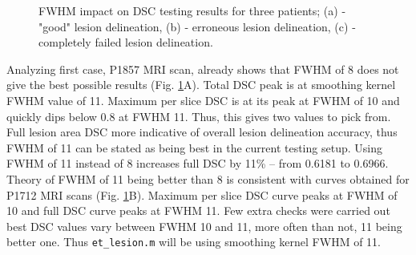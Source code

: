 \documentclass[12pt]{article}
\begin{document}
\begin{figure}[!htb]
\centering
{}


\caption{FWHM impact on DSC testing results for three patients; (a) - "good" lesion delineation, (b) - erroneous lesion delineation, (c) - completely failed lesion delineation.}
\label{fig:fwhms}
\end{figure}

Analyzing first case, P1857 MRI scan, already shows that FWHM of 8 does not give the best possible results (Fig. \ref{fig:fwhms}A). Total DSC peak is at smoothing kernel FWHM value of 11. Maximum per slice DSC is at its peak at FWHM of 10 and quickly dips below 0.8 at FWHM 11. Thus, this gives two values to pick from. Full lesion area DSC more indicative of overall lesion delineation accuracy, thus FWHM of 11 can be stated as being best in the current testing setup. Using FWHM of 11 instead of 8 increases full DSC by 11\% – from 0.6181 to 0.6966. Theory of  FWHM of 11 being better than 8 is consistent with curves obtained for P1712 MRI scans (Fig. \ref{fig:fwhms}B). Maximum per slice DSC curve peaks at FWHM of 10 and full DSC curve peaks at FWHM 11. Few extra checks were carried out best DSC values vary between FWHM 10 and 11, more often than not, 11 being better one. Thus \texttt{et\_lesion.m} will be using smoothing kernel FWHM of 11.
\end{document}
